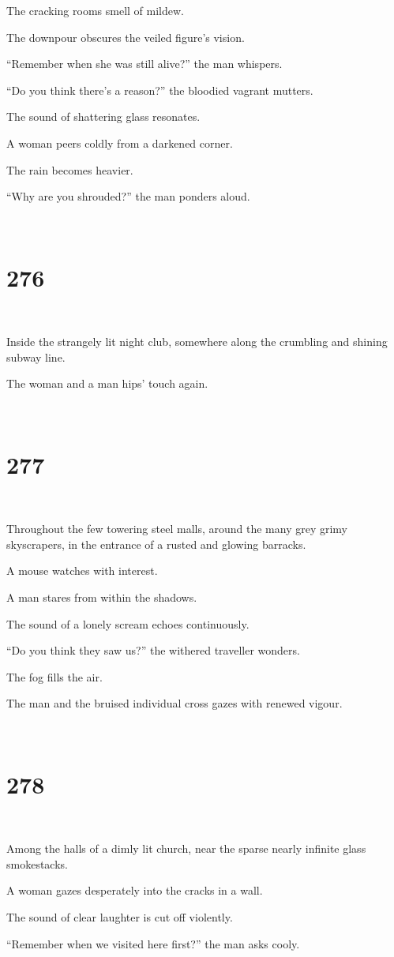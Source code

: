 \documentclass{report}
\begin{document}
The cracking rooms smell of mildew.

The downpour obscures the veiled figure's vision.

``Remember when she was still alive?'' the man whispers.

``Do you think there's a reason?'' the bloodied vagrant mutters.

The sound of shattering glass resonates.

A woman peers coldly from a darkened corner.

The rain becomes heavier.

``Why are you shrouded?'' the man ponders aloud.

~
\chapter*{276}
~

Inside the strangely lit night club, somewhere along the crumbling and shining subway line.

The woman and a man hips' touch again.

~
\chapter*{277}
~

Throughout the few towering steel malls, around the many grey grimy skyscrapers, in the entrance of a rusted and glowing barracks.

A mouse watches with interest.

A man stares from within the shadows.

The sound of a lonely scream echoes continuously.

``Do you think they saw us?'' the withered traveller wonders.

The fog fills the air.

The man and the bruised individual cross gazes with renewed vigour.

~
\chapter*{278}
~

Among the halls of a dimly lit church, near the sparse nearly infinite glass smokestacks.

A woman gazes desperately into the cracks in a wall.

The sound of clear laughter is cut off violently.

``Remember when we visited here first?'' the man asks cooly.
\end{document}

